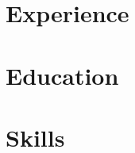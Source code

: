 \def\sitepage{professional}
\section{Experience}





\section{Education}







\clearpage



\section{Skills}
\begin{cvcolumns}
  
  
  
\end{cvcolumns}

